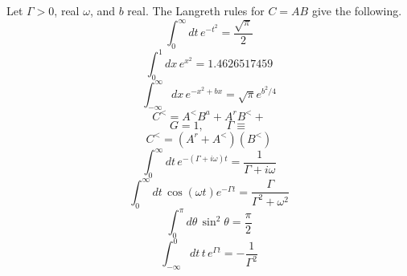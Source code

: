 \documentclass{article}
\begin{document}
Let $\Gamma>0$, real $\omega$, and $b$ real. The Langreth rules for $C = AB$ give the following.
\begin{equation}\label{k1}
\int_0^{\infty} dt\, e^{-t^2} = \frac{\sqrt{\pi}}{2}
\end{equation}
\begin{equation}\label{k3}
\int_0^{1} dx\, e^{x^2} = 1.4626517459
\end{equation}
\begin{equation}\label{k5}
\int_{-\infty}^{\infty} dx\, e^{-x^2 + b x} = \sqrt{\pi} e^{b^2/4}
\end{equation}
\begin{equation}\label{k6}
C^{<} = A^{<}B^{a} + A^{r}B^{<} +
\end{equation}
\begin{equation}\label{k7}
G = 1, \qquad \Gamma \equiv
\end{equation}
\begin{equation}\label{k8}
C^{<} = (A^{r} + A^{<})(B^{<})
\end{equation}
\begin{equation}\label{k10}
\int_0^{\infty} dt\, e^{-(\Gamma + i\omega) t} = \frac{1}{\Gamma + i\omega}
\end{equation}
\begin{equation}\label{k11}
\int_0^{\infty} dt\, \cos(\omega t) e^{-\Gamma t} = \frac{\Gamma}{\Gamma^2+\omega^2}
\end{equation}
\begin{equation}\label{k12}
\int_{0}^{\pi} d\theta\, \sin^2\theta = \frac{\pi}{2}
\end{equation}
\begin{equation}\label{k13}
\int_{-\infty}^{0} dt\, t\, e^{\Gamma t} = -\frac{1}{\Gamma^2}
\end{equation}
\end{document}
